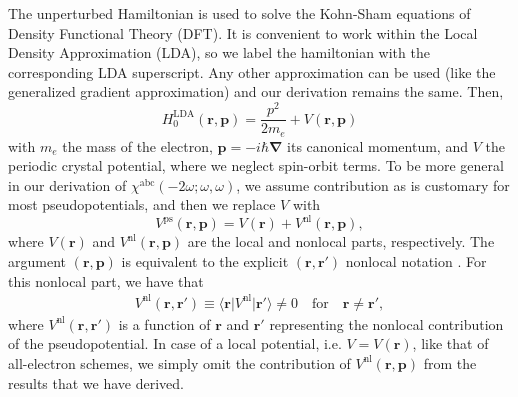The unperturbed Hamiltonian is used to solve the Kohn-Sham equations
\cite{kohnPR65} of Density Functional Theory (DFT). It is convenient to work
within the Local Density Approximation (LDA), so we label the hamiltonian with
the corresponding LDA superscript. Any other approximation can be used (like the
generalized gradient approximation) and our derivation remains the same. Then,
\begin{equation}\label{ache.2}
H^{\mathrm{LDA}}_{0}(\mathbf{r},\mathbf{p})
= \frac{p^{2}}{2m_e}+V(\mathbf{r},\mathbf{p})
\end{equation}
with $m_e$ the mass of the electron, $\mathbf{p}=-i\hbar\boldsymbol{\nabla}$ its
canonical momentum, and $V$ the periodic crystal potential, where we neglect
spin-orbit terms. To be more general in our derivation of
$\chi^{\mathrm{abc}}(-2\omega;\omega,\omega)$, we assume
contribution as is customary for most pseudopotentials, and then we replace $V$
with
\begin{equation}
V^{\mathrm{ps}}(\mathbf{r},\mathbf{p})
= V(\mathbf{r})+V^{\mathrm{nl}}(\mathbf{r},\mathbf{p}),
\end{equation}
where $V(\mathbf{r})$ and $V^{\mathrm{nl}}(\mathbf{r},\mathbf{p})$ are the local
and nonlocal parts, respectively. The argument $(\mathbf{r},\mathbf{p})$ is
equivalent to the explicit $(\mathbf{r},\mathbf{r}')$ nonlocal notation
\cite{ismailPRL01}. For this nonlocal part, we have that
\begin{align}\label{ache.3n}
V^{\mathrm{nl}}(\mathbf{r},\mathbf{r}')\equiv
\langle\mathbf{r}\vert
V^{\mathrm{nl}}
\vert\mathbf{r}'\rangle \neq 0 
\quad\text{for}\quad\mathbf{r} \neq \mathbf{r}',
\end{align}
where $V^{\mathrm{nl}}(\mathbf{r},\mathbf{r}')$ is a function of $\mathbf{r}$
and $\mathbf{r}'$ representing the nonlocal contribution of the pseudopotential.
In case of a local potential, i.e. $V= V(\mathbf{r})$, like that of all-electron
schemes, we simply omit the contribution of
$V^{\mathrm{nl}}(\mathbf{r},\mathbf{p})$ from the results that we have derived.

